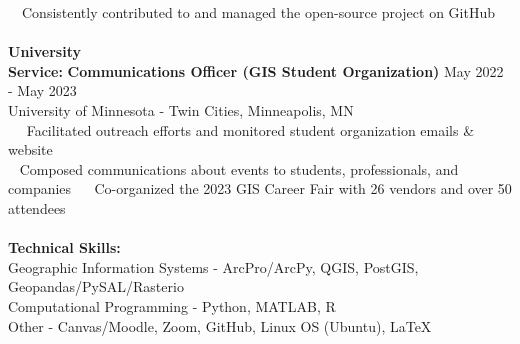 \documentclass[letterpaper,12pt]{article}
\numberwithin{equation}{section}
\begin{document}
\hspace*{1.2in} \textbullet ~~Consistently contributed to and managed the open-source project on GitHub
\\\\
\noindent\textbf{University}\\
\noindent\textbf{Service:} \hspace*{.45in}\textbf{Communications Officer (GIS Student Organization)} \hspace*{.43in} May 2022 - May 2023\\
\hspace*{1.16in} University of Minnesota - Twin Cities, Minneapolis, MN \vspace*{.1cm}\\
\hspace*{1.2in} \textbullet ~~ Facilitated outreach efforts and monitored student organization emails \& website\\
\hspace*{1.2in} \textbullet ~ Composed communications about events to students, professionals, and companies
\hspace*{1.2in} \textbullet ~~ Co-organized the 2023 GIS Career Fair with 26 vendors and over 50 attendees
\\\\
\noindent\textbf{Technical Skills:}
\vspace*{.3cm} \\ Geographic Information Systems - ArcPro/ArcPy, QGIS, PostGIS, Geopandas/PySAL/Rasterio
\vspace*{.3cm} \\ Computational Programming - Python, MATLAB, R
\vspace*{.3cm} \\ Other - Canvas/Moodle, Zoom, GitHub, Linux OS (Ubuntu), \LaTeX
\end{document}
